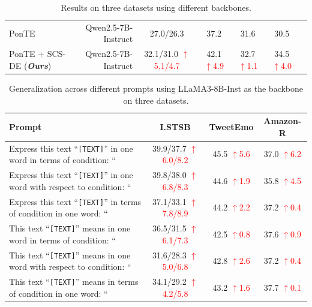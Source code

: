\documentclass[11pt]{article}
\newcommand{\up}[1]{\textcolor{red}{{$\uparrow$#1}}}
\begin{document}
\begin{table}[t]
\begin{tabular}{lrccccc}
\midrule
PonTE & Qwen2.5-7B-Instruct &  27.0/26.3 & 37.2 &  31.6  &30.5 \\
PonTE + SCS-DE (\textbf{\textit{Ours}}) & Qwen2.5-7B-Instruct & \cellcolor{tabcolor3} 32.1/31.0 \up{5.1/4.7} & \cellcolor{tabcolor3} 42.1 \up{4.9} & \cellcolor{tabcolor3} 32.7 \up{1.1} & \cellcolor{tabcolor3} 34.5 \up{4.0}\\
\bottomrule
\end{tabular}
\caption{Results on three datasets using different backbones.}
\label{tab:backbone}
\end{table}

\begin{table}[th] \small
    \centering
    \setlength{\tabcolsep}{6pt}
    \begin{tabular}{l ccc}
        \toprule
        \textbf{Prompt} & \textbf{I.STSB} & \textbf{TweetEmo} & \textbf{Amazon-R}\\
        \midrule
        Express this text ``\texttt{[TEXT]}'' in one word in terms of {condition}: `` &  39.9/37.7  \up{6.0/8.2} &45.5 \up{5.6} &37.0 \up{6.2} \\
        Express this text ``\texttt{[TEXT]}'' in one word with respect to {condition}: `` &39.8/38.0 \up{6.8/8.3} &44.6 \up{1.9} &35.8 \up{4.5} \\
        Express this text ``\texttt{[TEXT]}'' in terms of {condition} in one word: `` &37.1/33.1  \up{7.8/8.9} &44.2 \up{2.2} &37.2 \up{0.4} \\
        \midrule
        This text ``\texttt{[TEXT]}'' means in one word in terms of {condition}: `` &36.5/31.5 \up{6.1/7.3} &42.5 \up{0.8}  &37.6 \up{0.9} \\
        This text ``\texttt{[TEXT]}'' means in one word with respect to {condition}: `` &  31.6/28.3 \up{5.0/6.8} &42.8 \up{2.6} &37.2 \up{0.4}\\
        This text ``\texttt{[TEXT]}'' means in terms of {condition} in one word: `` &34.1/29.2 \up{4.2/5.8} &43.2 \up{1.6} &37.7 \up{0.1} \\
        \bottomrule
    \end{tabular}
    \caption{Generalization across different prompts using LLaMA3-8B-Inst as the backbone on three datasets.}
    \label{tab:prompt}
\end{table}
\end{document}
